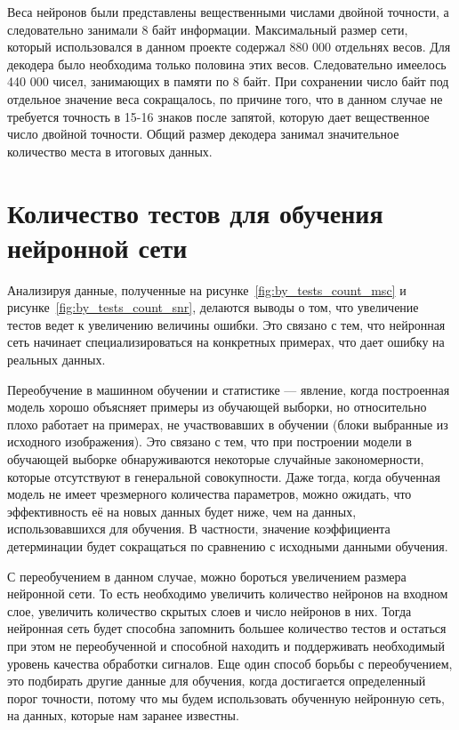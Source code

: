Веса нейронов были представлены вещественными числами двойной точности, а следовательно занимали 8 байт информации.
Максимальный размер сети, который использовался в данном проекте содержал 880 000 отдельнях весов. Для декодера было необходима только половина этих весов.
Следовательно имеелось 440 000 чисел, занимающих в памяти по 8 байт. При сохранении число байт под отдельное значение веса сокращалось, по причине того, что в данном
случае не требуется точность в 15-16 знаков после запятой, которую дает вещественное число двойной точности. Общий размер декодера занимал значительное количество места в итоговых данных.

\section{Количество тестов для обучения нейронной сети}
\label{sub:analysis:tests}

Анализируя данные, полученные на рисунке~\ref{fig:by_tests_count_msc} и рисунке~\ref{fig:by_tests_count_snr},
делаются выводы о том, что увеличение тестов ведет к увеличению величины ошибки.
Это связано с тем, что нейронная сеть начинает специализироваться на конкретных примерах, что дает ошибку на реальных данных.

Переобучение в машинном обучении и статистике --- явление, когда построенная модель хорошо объясняет примеры из обучающей выборки,
но относительно плохо работает на примерах, не участвовавших в обучении (блоки выбранные из исходного изображения).
Это связано с тем, что при построении модели в обучающей выборке обнаруживаются некоторые случайные закономерности,
которые отсутствуют в генеральной совокупности.
Даже тогда, когда обученная модель не имеет чрезмерного количества параметров, можно ожидать, что эффективность её на новых данных будет ниже,
чем на данных, использовавшихся для обучения. В частности, значение коэффициента детерминации будет сокращаться по сравнению с исходными данными обучения.

С переобучением в данном случае, можно бороться увеличением размера нейронной сети. То есть необходимо увеличить количество нейронов на входном слое,
увеличить количество скрытых слоев и число нейронов в них. Тогда нейронная сеть будет способна запомнить большее количество тестов и остаться при этом
не переобученной и способной находить и поддерживать необходимый уровень качества обработки сигналов. Еще один способ борьбы с переобучением,
это подбирать другие данные для обучения, когда достигается определенный порог точности, потому что мы будем использовать обученную нейронную сеть, на данных,
которые нам заранее известны.

